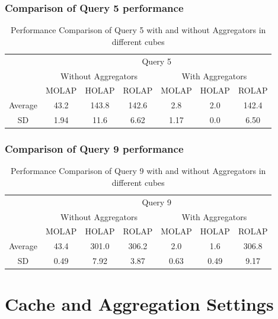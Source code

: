 \documentclass[a4paper,12pt]{article} %
\begin{document}
\subsubsection{Comparison of Query 5 performance}

\begin{table}[H]
\centering
\caption{Performance Comparison of Query 5 with and without Aggregators in different cubes}
\label{tab:query5_processing_performance}
\begin{tabular}{@{}lcccccc@{}}
\toprule
\multirow{3}{*}{} & \multicolumn{6}{c}{Query 5} \\ \cmidrule(l){2-7} 
 & \multicolumn{3}{c|}{Without Aggregators} & \multicolumn{3}{c}{With Aggregators} \\ \cmidrule(l){2-7} 
 & MOLAP & HOLAP & \multicolumn{1}{c|}{ROLAP} & MOLAP & HOLAP & ROLAP \\ \midrule
\multicolumn{1}{c|}{Average} & 43.2 & 143.8 & \multicolumn{1}{c|}{142.6} & 2.8 & 2.0 & 142.4 \\
\multicolumn{1}{c|}{SD} & 1.94 & 11.6 & \multicolumn{1}{c|}{6.62} & 1.17 & 0.0 & 6.50
\end{tabular}
\end{table}

\subsubsection{Comparison of Query 9 performance}
\begin{table}[H]
\centering
\caption{Performance Comparison of Query 9 with and without Aggregators in different cubes}
\label{tab:query5_processing_performance}
\begin{tabular}{@{}lcccccc@{}}
\toprule
\multirow{3}{*}{} & \multicolumn{6}{c}{Query 9} \\ \cmidrule(l){2-7} 
 & \multicolumn{3}{c|}{Without Aggregators} & \multicolumn{3}{c}{With Aggregators} \\ \cmidrule(l){2-7} 
 & MOLAP & HOLAP & \multicolumn{1}{c|}{ROLAP} & MOLAP & HOLAP & ROLAP \\ \midrule
\multicolumn{1}{c|}{Average} & 43.4 & 301.0 & \multicolumn{1}{c|}{306.2} & 2.0 & 1.6 & 306.8 \\
\multicolumn{1}{c|}{SD} & 0.49 & 7.92 & \multicolumn{1}{c|}{3.87} & 0.63 & 0.49 & 9.17
\end{tabular}
\end{table}

\newpage
\section{Cache and Aggregation Settings}
\end{document}
